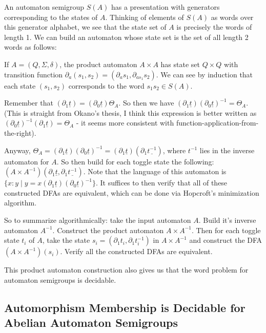 \documentclass[11pt]{article}
\begin{document}
An automaton semigroup $S(A)$ has a presentation with generators
corresponding to the states of $A$. Thinking of elements of $S(A)$ as
words over this generator alphabet, we see that the state set of $A$
is precisely the words of length 1. We can build an automaton whose
state set is the set of all length 2 words as follows:

If $A = (Q, \Sigma, \delta)$, the product automaton $A \times A$ has
state set $Q\times Q$ with transition function
$\partial_a (s_1, s_2) = (\partial_a s_1, \partial_{a s_1} s_2)$. We
can see by induction that each state $(s_1, s_2)$ corresponds to the
word $s_1 s_2 \in S(A)$.

Remember that
$(\partial_1 \underline{t}) = (\partial_0 \underline{t})\Theta_A$. So
then we have
$(\partial_1 \underline{t})(\partial_0 \underline{t})^{-1} =
\Theta_A$. (This is straight from Okano's thesis, I think this
expression is better written as
$(\partial_0 \underline{t})^{-1}(\partial_1 \underline{t})= \Theta_A$
- it seems more consistent with function-application-from-the-right).

Anyway, $\Theta_A = (\partial_1 \underline{t})(\partial_0 \underline{t})^{-1} = (\partial_1 \underline{t})(\partial_1 \underline{t^{-1}})$, where $t^{-1}$ lies in the inverse automaton for $A$. So then build for each toggle state the following: $(A\times A^{-1})(\partial_1 \underline{t}, \partial_1 \underline{t^{-1}})$. Note that the language of this automaton is $\{ x : y \mid y = x(\partial_1 \underline{t})(\partial_0 \underline{t})^{-1}\}$. It suffices to then verify that all of these constructed DFAs are equivalent, which can be done via Hopcroft's minimization algorithm.

So to summarize algorithmically: take the input automaton $A$. Build
it's inverse automaton $A^{-1}$. Construct the product automaton
$A\times A^{-1}$. Then for each toggle state $t_i$ of $A$, take the
state $s_i = (\partial_1 t_i, \partial_1 t_i^{-1})$ in
$A\times A^{-1}$ and construct the DFA $(A\times A^{-1})(s_i)$. Verify
all the constructed DFAs are equivalent.


This product automaton construction also gives us that the word
problem for automaton semigroups is decidable.


\subsection{Automorphism Membership is Decidable for Abelian Automaton Semigroups}
\end{document}
